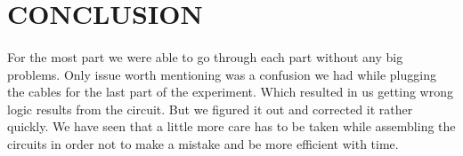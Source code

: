 \documentclass[pdftex,12pt,a4paper]{article}
\begin{document}
\section{CONCLUSION}
\begin{flushleft}
\paragraph{}For the most part we were able to go through each part without any big problems. Only issue worth mentioning was a confusion we had while plugging the cables for the last part of the experiment. Which resulted in us getting wrong logic results from the circuit. But we figured it out and corrected it rather quickly. We have seen that a little more care has to be taken while assembling the circuits in order not to make a mistake and be more efficient with time.
\end{flushleft}

\nocite{overleaf}
\nocite{reportGuide}

\newpage





\end{document}
